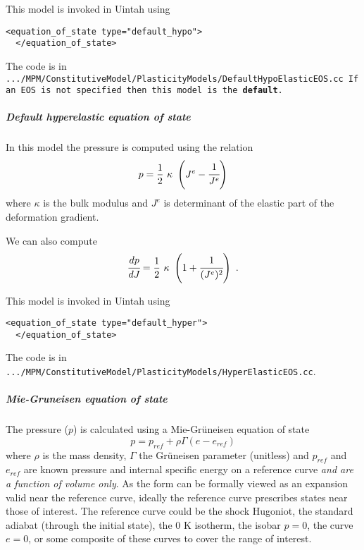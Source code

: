 This model is invoked in Uintah using
\begin{Verbatim}[fontsize=\footnotesize]
  <equation_of_state type="default_hypo">
  </equation_of_state>
\end{Verbatim}
The code is in \tt.../MPM/ConstitutiveModel/PlasticityModels/DefaultHypoElasticEOS.cc \normalfont
If an EOS is not specified then this model is the {\bf default}.

\subparagraph{Default hyperelastic equation of state}
In this model the pressure is computed using the relation
\begin{equation}
  p = \frac{1}{2}~\kappa~\left(J^e - \cfrac{1}{J^e}\right)
\end{equation}
where $\kappa$ is the bulk modulus and $J^e$ is determinant of the elastic
part of the deformation gradient.

We can also compute
\begin{equation}
  \cfrac{dp}{dJ} = \frac{1}{2}~\kappa~\left(1 + \cfrac{1}{(J^e)^2}\right) ~.
\end{equation}

This model is invoked in Uintah using
\begin{Verbatim}[fontsize=\footnotesize]
  <equation_of_state type="default_hyper">
  </equation_of_state>
\end{Verbatim}
The code is in \verb|.../MPM/ConstitutiveModel/PlasticityModels/HyperElasticEOS.cc|.

\subparagraph{Mie-Gruneisen equation of state}
The pressure ($p$) is calculated using a Mie-Gr{\"u}neisen equation of state
\begin{equation} \label{eq:MG}
  p = p_{ref} +\rho \Gamma (e - e_{ref})
\end{equation}
where $\rho$ is the mass density, $\Gamma$ the Gr{\"u}neisen parameter (unitless) and $p_{ref}$
and $e_{ref}$ are known pressure and internal specific energy on a reference curve {\it and are a function
of volume only}.  As the form can be formally viewed as an expansion valid near the reference curve,
ideally the reference curve prescribes states near those of interest.  The reference curve could be
the shock Hugoniot, the standard adiabat (through the initial state), the 0 K isotherm, the isobar $p=0$,
the curve $e=0$, or some composite of these curves to cover the range of interest.  

